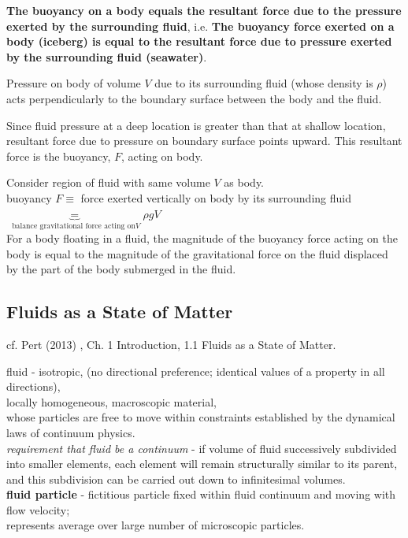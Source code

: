 \documentclass[10pt]{amsart}
\begin{document}
\begin{multicols*}{2}
\textbf{The buoyancy on a body equals the resultant force due to the pressure exerted by the surrounding fluid}, i.e.
\textbf{The buoyancy force exerted on a body (iceberg) is equal to the resultant force due to pressure exerted by the surrounding fluid (seawater)}.


Pressure on body of volume $V$ due to its surrounding fluid (whose density is $\rho$) acts perpendicularly to the boundary surface between the body and the fluid. 

Since fluid pressure at a deep location is greater than that at shallow location, resultant force due to pressure on boundary surface points upward. This resultant force is the buoyancy, $F$, acting on body. 

Consider region of fluid with same volume $V$ as body. \\

buoyancy $F \equiv$ force exerted vertically on body by its surrounding fluid $ \underbrace{ =}_{ \text{ balance gravitational force acting on} V }  \rho g V$ \\

For a body floating in a fluid, the magnitude of the buoyancy force acting on the body is equal to the magnitude of the gravitational force on the fluid displaced by the part of the body submerged in the fluid.



\subsection{Fluids as a State of Matter}

cf. Pert (2013) \cite{Pert2013}, Ch. 1 Introduction, 1.1 Fluids as a State of Matter.

fluid - isotropic, (no directional preference; identical values of a property in all directions), \\
locally homogeneous, macroscopic material, \\
whose particles are free to move within constraints established by the dynamical laws of continuum physics. \\
\emph{requirement that fluid be a continuum} - if volume of fluid successively subdivided into smaller elements, each element will remain structurally similar to its parent, and this subdivision can be carried out down to infinitesimal volumes. \\

\textbf{fluid particle} - fictitious particle fixed within fluid continuum and moving with flow velocity; \\
represents average over large number of microscopic particles. \\


\end{multicols*}
\end{document}
